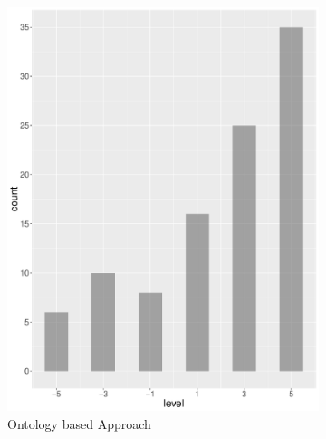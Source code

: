 \begin{figure}
    \centering
    \begin{subfigure}[b]{0.4\textwidth}
        \includegraphics[width=\textwidth]{plots/climate_change/hist_level_nn}
        \caption{Ontology based Approach}
        \label{fig:hist_level_climate_change_nn}
    \end{subfigure}
    ~
    \begin{subfigure}[b]{0.4\textwidth}

\end{subfigure}
\end{figure}
